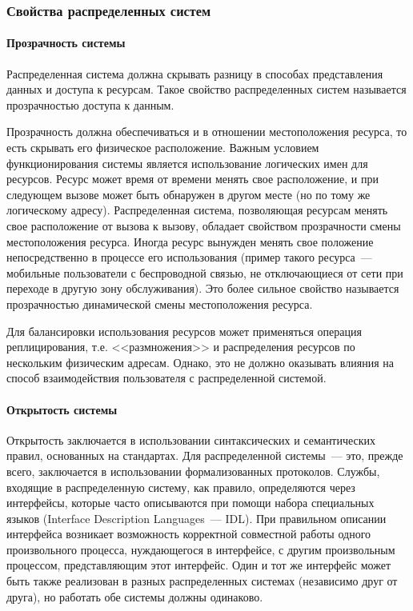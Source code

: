 \subsubsection{Свойства распределенных систем}
\paragraph{Прозрачность системы}
Распределенная система должна скрывать разницу в способах представления данных и доступа к ресурсам. Такое свойство распределенных систем называется прозрачностью доступа к данным.

Прозрачность должна обеспечиваться и в отношении местоположения ресурса, то есть скрывать его физическое расположение. Важным условием функционирования системы является использование логических имен для ресурсов. Ресурс может время от времени менять свое расположение, и при следующем вызове может быть обнаружен в другом месте (но по тому же логическому адресу). Распределенная система, позволяющая ресурсам менять свое расположение от вызова к вызову, обладает свойством прозрачности смены местоположения ресурса. Иногда ресурс вынужден менять свое положение непосредственно в процессе его использования (пример такого ресурса~--- мобильные пользователи с беспроводной связью, не отключающиеся от сети при переходе в другую зону обслуживания). Это более сильное свойство называется прозрачностью динамической смены местоположения ресурса.

Для балансировки использования ресурсов может применяться операция реплицирования, т.е. <<размножения>> и распределения ресурсов по нескольким физическим адресам. Однако, это не должно оказывать влияния на способ взаимодействия пользователя с распределенной системой.

\paragraph{Открытость системы}

Открытость заключается в использовании синтаксических и семантических правил, основанных на стандартах. Для распределенной системы~--- это, прежде всего, заключается в использовании формализованных протоколов. Службы, входящие в распределенную систему, как правило, определяются через интерфейсы, которые часто описываются при помощи набора специальных языков (Interface Description Languages~--- IDL). При правильном описании интерфейса возникает возможность корректной совместной работы одного произвольного процесса, нуждающегося в интерфейсе, с другим произвольным процессом, представляющим этот интерфейс. Один и тот же интерфейс может быть также реализован в разных распределенных системах (независимо друг от друга), но работать обе системы должны одинаково.

